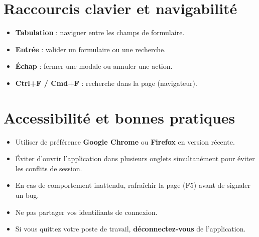 
\section{Raccourcis clavier et navigabilit\'e}

\begin{tipbox}
  \begin{itemize}
    \item \textbf{Tabulation} : naviguer entre les champs de formulaire.
    \item \textbf{Entr\'ee} : valider un formulaire ou une recherche.
    \item \textbf{\'Echap} : fermer une modale ou annuler une action.
    \item \textbf{Ctrl+F / Cmd+F} : recherche dans la page (navigateur).
  \end{itemize}
\end{tipbox}

\section{Accessibilit\'e et bonnes pratiques}

\begin{itemize}
  \item Utiliser de pr\'ef\'erence \textbf{Google Chrome} ou \textbf{Firefox} en version r\'ecente.
  \item \'Eviter d'ouvrir l'application dans plusieurs onglets simultan\'ement pour \'eviter les conflits de session.
  \item En cas de comportement inattendu, rafra\^ichir la page (\textsf{F5}) avant de signaler un bug.
  \item Ne pas partager vos identifiants de connexion.
  \item Si vous quittez votre poste de travail, \textbf{d\'econnectez-vous} de l'application.
\end{itemize}
